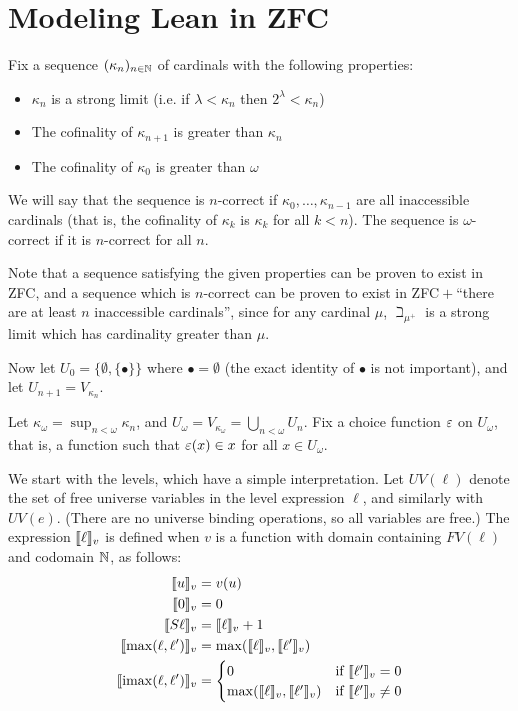 \section{Modeling Lean in ZFC}\label{sec:soundness}
Fix a sequence $(\kappa_n)_{n\in\mathbb{N}}$ of cardinals with the following properties:
\begin{itemize}
\item $\kappa_n$ is a strong limit (i.e. if $\lambda<\kappa_n$ then $2^\lambda<\kappa_n$)
\item The cofinality of $\kappa_{n+1}$ is greater than $\kappa_n$
\item The cofinality of $\kappa_0$ is greater than $\omega$
\end{itemize}
We will say that the sequence is $n$-correct if $\kappa_0,\dots,\kappa_{n-1}$ are all inaccessible cardinals (that is, the cofinality of $\kappa_k$ is $\kappa_k$ for all $k<n$). The sequence is $\omega$-correct if it is $n$-correct for all $n$.

Note that a sequence satisfying the given properties can be proven to exist in ZFC, and a sequence which is $n$-correct can be proven to exist in ZFC${}+{}$``there are at least $n$ inaccessible cardinals'', since for any cardinal $\mu$, $\beth_{\mu^+}$ is a strong limit which has cardinality greater than $\mu$.

Now let $U_0=\{\emptyset,\{\bullet\}\}$ where $\bullet=\emptyset$ (the exact identity of $\bullet$ is not important), and let $U_{n+1}=V_{\kappa_n}$.

Let $\kappa_\omega=\operatorname{sup}_{n<\omega}\kappa_n$, and $U_\omega=V_{\kappa_\omega}=\bigcup_{n<\omega} U_n$. Fix a choice function $\varepsilon$ on $U_\omega$, that is, a function such that $\varepsilon(x)\in x$ for all $x\in U_\omega$.

We start with the levels, which have a simple interpretation. Let $UV(\ell)$ denote the set of free universe variables in the level expression $\ell$, and similarly with $UV(e)$. (There are no universe binding operations, so all variables are free.) The expression $\llbracket \ell\rrbracket_v$ is defined when $v$ is a function with domain containing $FV(\ell)$ and codomain $\mathbb{N}$, as follows:
\begin{align*}
\llbracket u\rrbracket_v&=v(u)\\
\llbracket 0\rrbracket_v&=0\\
\llbracket S\ell\rrbracket_v&=\llbracket \ell\rrbracket_v+1\\
\llbracket \max(\ell,\ell')\rrbracket_v&=\max(\llbracket \ell\rrbracket_v,\llbracket \ell'\rrbracket_v)\\
\llbracket \operatorname{imax}(\ell,\ell')\rrbracket_v&=\begin{cases}
0&\mbox{if }\llbracket \ell'\rrbracket_v=0\\
\max(\llbracket \ell\rrbracket_v,\llbracket \ell'\rrbracket_v)&\mbox{if }\llbracket \ell'\rrbracket_v\ne 0
\end{cases}
\end{align*}

